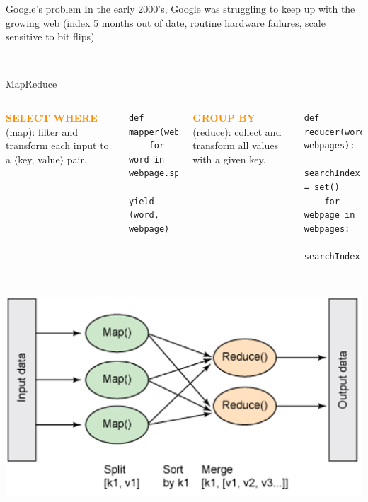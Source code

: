 \documentclass[aspectratio=169]{beamer}
\begin{document}
\begin{frame}{Google's problem}
\large
\vspace{0.45 cm}
In the early 2000's, Google was struggling to keep up with the growing web (index 5 months out of date, routine hardware failures, scale sensitive to bit flips).

\vspace{0.7 cm}

\vspace{0.7 cm}

\vspace{0.7 cm}
\mbox{ } \hfill {} \hfill \mbox{ }

\vspace{0.7 cm}

\end{frame}

\begin{frame}[fragile]{MapReduce}
\vspace{0.5 cm}
\begin{columns}
\textcolor{darkorange}{\bf SELECT}-\textcolor{darkorange}{\bf WHERE} (map): filter and transform each input to a $\langle$key, value$\rangle$ pair.

\small
\begin{verbatim}
def mapper(webpage):
    for word in webpage.split():
        yield (word, webpage)

\end{verbatim}

\textcolor{darkorange}{\bf GROUP BY} (reduce): collect and transform all values with a given key.

\small
\begin{verbatim}
def reducer(word, webpages):
    searchIndex[word] = set()
    for webpage in webpages:
        searchIndex[word].add(webpage)
\end{verbatim}
\end{columns}

\vspace{0.25 cm}
\mbox{ } \hfill \includegraphics[width=0.55\linewidth]{mapreduce-diagram-by-ibm.png} \hfill \mbox{ }
\end{frame}
\end{document}

